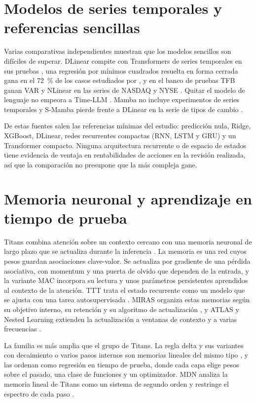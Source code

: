 \documentclass[11pt,a4paper]{report}
\begin{document}
\section{Modelos de series temporales y referencias sencillas}
Varias comparativas independientes muestran que los modelos sencillos son
difíciles de superar. DLinear compite con Transformers de series temporales en
sus pruebas \parencite{zeng2023dlinear}, una regresión por mínimos cuadrados
resuelta en forma cerrada gana en el 72~\% de los casos estudiados por
\textcite{toner2024linear}, y en el banco de pruebas TFB ganan VAR y NLinear en
las series de NASDAQ y NYSE \parencite{qiu2024tfb}. Quitar el modelo de
lenguaje no empeora a Time-LLM \parencite{tan2024llmts}. Mamba no incluye
experimentos de series temporales \parencite{gu2023mamba} y S-Mamba pierde
frente a DLinear en la serie de tipos de cambio \parencite{wang2025smamba}.

De estas fuentes salen las referencias mínimas del estudio: predicción nula,
Ridge, XGBoost, DLinear, redes recurrentes compactas (RNN, LSTM y GRU) y un
Transformer compacto. Ninguna arquitectura recurrente o de
espacio de estados tiene evidencia de ventaja en rentabilidades de acciones
en la revisión realizada, así que la comparación no presupone que la más
compleja gane.

\section{Memoria neuronal y aprendizaje en tiempo de prueba}
Titans combina atención sobre un contexto cercano con una memoria neuronal de
largo plazo que se actualiza durante la inferencia \parencite{behrouz2025titans}.
La memoria es una red cuyos pesos guardan asociaciones clave-valor. Se
actualiza por gradiente de una pérdida asociativa, con momentum y una puerta de
olvido que dependen de la entrada, y la variante MAC incorpora su lectura y
unos parámetros persistentes aprendidos al contexto de la atención. TTT trata
el estado recurrente como un modelo que se ajusta con una tarea
autosupervisada \parencite{sun2025ttt}. MIRAS organiza estas memorias según su
objetivo interno, su retención y su algoritmo de actualización
\parencite{behrouz2026miras}, y ATLAS y Nested Learning extienden la
actualización a ventanas de contexto y a varias frecuencias
\parencite{behrouz2025atlas,behrouz2025nested}.

La familia es más amplia que el grupo de Titans. La regla delta y sus
variantes con decaimiento o varios pasos internos son memorias lineales del
mismo tipo \parencite{yang2024deltanet,yang2024gateddelta,siems2025deltaproduct},
y \textcite{wang2026testtimeregression} las ordenan como regresión en tiempo
de prueba, donde cada capa elige pesos sobre el pasado, una clase de
funciones y un optimizador. MDN analiza la memoria lineal de Titans como un
sistema de segundo orden y restringe el espectro de cada paso
\parencite{huang2026mdn}.
\end{document}

